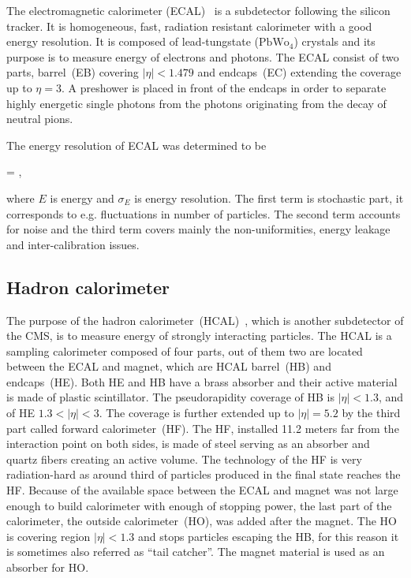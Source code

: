 The electromagnetic calorimeter (ECAL)~\cite{tdrECAL} is a subdetector following the silicon tracker. It is homogeneous, fast, radiation resistant calorimeter with a good energy resolution. It is composed of lead-tungstate ($\mathrm{PbWo_{4}}$) crystals and its purpose is to measure energy of electrons and photons. The ECAL consist of two parts, barrel~(EB) covering $|\eta|<1.479$ and endcaps~(EC) extending the coverage up to $\eta =3$. A preshower is placed in front of the endcaps in order to separate highly energetic single photons from the photons originating from the decay of neutral pions.

The energy resolution of ECAL was determined to be

{
  =  \bigoplus {}  ,
}

where $E$ is energy and $\sigma_{E}$ is energy resolution. The first term is stochastic part, it corresponds to e.g. fluctuations in number of particles. The second term accounts for noise and the third term covers mainly the non-uniformities, energy leakage and inter-calibration issues.


\subsection{Hadron calorimeter}

The purpose of the hadron calorimeter~(HCAL)~\cite{tdrHCAL}, which is another subdetector of the CMS, is to measure energy of strongly interacting particles.  The HCAL is a sampling calorimeter composed of four parts, out of them two are located between the ECAL and magnet, which are HCAL barrel~(HB) and endcaps~(HE). Both HE and HB have a brass absorber and their active material is made of plastic scintillator. The pseudorapidity coverage of HB is $|\eta|<1.3$, and of HE $1.3<|\eta|<3$. The coverage is further extended up to $|\eta|=5.2$ by the third part called forward calorimeter~(HF). The HF, installed 11.2 meters far from the interaction point on both sides, is made of steel serving as an absorber and quartz fibers creating an active volume. The technology of the HF is very radiation-hard as around third of particles produced in the final state reaches the HF. Because of the available space between the ECAL and magnet was not large enough to build calorimeter with enough of stopping power, the last part of the calorimeter, the outside calorimeter~(HO), was added after the magnet. The HO is covering region $|\eta|<1.3$ and stops particles escaping the HB, for this reason it is sometimes also referred as ``tail catcher''. The magnet material is used as an absorber for HO.

